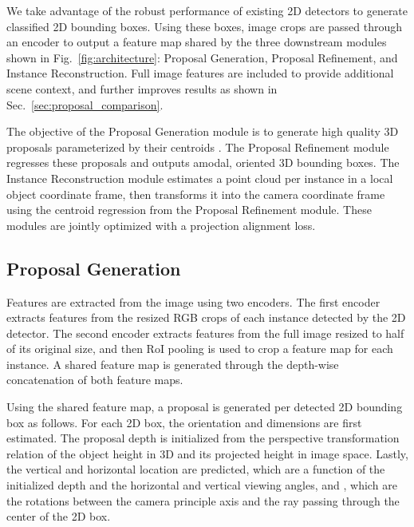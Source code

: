 \documentclass[10pt,twocolumn,letterpaper]{article}
\begin{document}
	We take advantage of the robust performance of existing 2D detectors to generate classified 2D bounding boxes. Using these boxes, image crops are passed through an encoder to output a feature map shared by the three downstream modules shown in Fig.~\ref{fig:architecture}: Proposal Generation, Proposal Refinement, and Instance Reconstruction. Full image features are included to provide additional scene context, and further improves results as shown in Sec.~\ref{sec:proposal_comparison}. 
	
	The objective of the Proposal Generation module is to generate high quality 3D proposals parameterized by their centroids . The Proposal Refinement module regresses these proposals and outputs amodal, oriented 3D bounding boxes. The Instance Reconstruction module estimates a point cloud per instance in a local object coordinate frame, then transforms it into the camera coordinate frame using the centroid regression from the Proposal Refinement module. These modules are jointly optimized with a projection alignment loss.
	
	\subsection{Proposal Generation}\label{sec:proposal_generation}
	Features are extracted from the image using two encoders. The first encoder extracts features from the resized RGB crops of each instance detected by the 2D detector. The second encoder extracts features from the full image resized to half of its original size, and then RoI pooling \cite{girshick_fast} is used to crop a feature map for each instance. A shared feature map is generated through the depth-wise concatenation of both feature maps.
	
	Using the shared feature map, a proposal is generated per detected 2D bounding box as follows. For each 2D box, the orientation and dimensions are first estimated. The proposal depth is initialized from the perspective transformation relation of the object height in 3D and its projected height in image space. Lastly, the vertical and horizontal location are predicted, which are a function of the initialized depth and the horizontal and vertical viewing angles,  and , which are the rotations between the camera principle axis  and the ray passing through the center of the 2D box.
	
\end{document}
